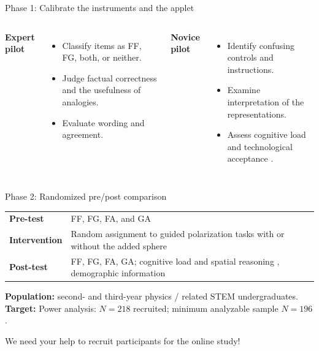 \begin{frame}{Phase 1: Calibrate the instruments and the applet}
\begin{columns}[T,onlytextwidth]
\textbf{Expert pilot}
\begin{itemize}
\item Classify items as FF, FG, both, or neither.
\item Judge factual correctness and the usefulness of analogies.
\item Evaluate wording and agreement.
\end{itemize}
\textbf{Novice pilot}
\begin{itemize}
\item Identify confusing controls and instructions.
\item Examine interpretation of the representations.
\item Assess cognitive load \citep{krieglstein2023} and technological acceptance \citep{abdullah2016}.
\end{itemize}
\end{columns}
\end{frame}

\begin{frame}{Phase 2: Randomized pre/post comparison}
\begin{tabularx}{\textwidth}{@{}P{.18\textwidth}Y@{}}
\toprule
\textbf{Pre-test} & FF, FG, FA, and GA\\
\textbf{Intervention} & Random assignment to guided polarization tasks with or without the added sphere\\
\textbf{Post-test} & FF, FG, FA, GA; cognitive load \citep{krieglstein2023} and spatial reasoning \citep{young2025}, demographic information\\
\bottomrule
\end{tabularx}\par
\vspace{3mm}
\textbf{Population:} second- and third-year physics / related STEM undergraduates.\\[2mm]
\textbf{Target:} Power analysis: $N=218$ recruited; minimum analyzable sample $N=196$.

We need your help to recruit participants for the online study! 
\end{frame}

